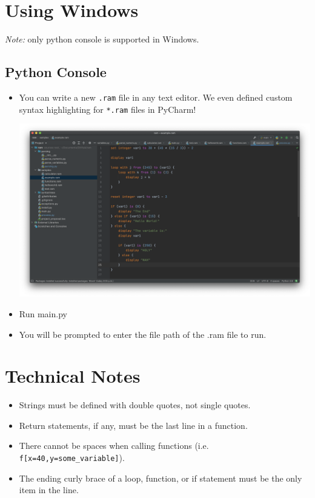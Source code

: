 \documentclass[11pt]{article}
\begin{document}
\section{Using Windows}

\emph{Note:} only python console is supported in Windows.

\subsection*{Python Console}

\begin{itemize}
        \item You can write a new \texttt{.ram} file in any text editor. We even defined custom syntax highlighting for \texttt{*.ram} files in PyCharm! 
            
        \begin{center}
            \includegraphics[scale=0.18]{terminal5.png}
        \end{center}
            
        \item Run main.py
            
        \item You will be prompted to enter the file path of the .ram file to run.
            
        \bigskip
            
        \bigskip
        
\end{itemize}


\section{Technical Notes}

\begin{itemize}
    \item Strings must be defined with double quotes, not single quotes.
    
    \item Return statements, if any, must be the last line in a function.
    
    \item There cannot be spaces when calling functions (i.e. \texttt{f[x=40,y=some\_variable]}).
    
    \item The ending curly brace of a loop, function, or if statement must be the only item in the line.
    
\end{itemize}
\end{document}
